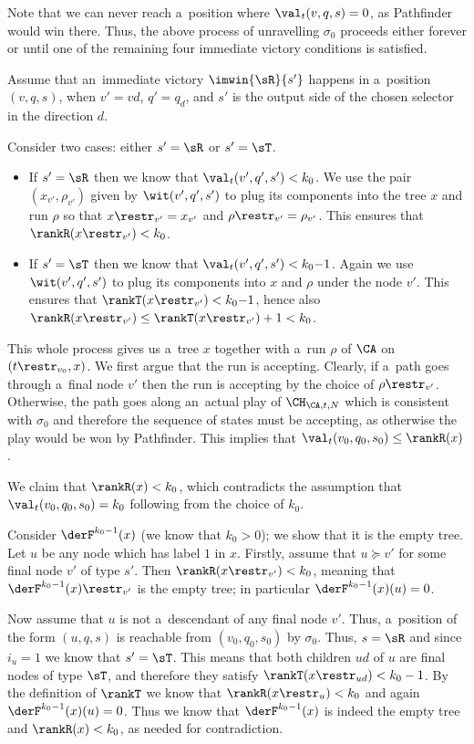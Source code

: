 \documentclass{lmcs}
\numberwithin{equation}{section}
\numberwithin{figure}{section}
\begin{document}
Note that we can never reach a~position where $\val_t(v,q,s)=0$, as Pathfinder would win there.
Thus, the above process of unravelling $\sigma_0$ proceeds either forever or until one of the remaining four immediate victory conditions is satisfied.

Assume that an~immediate victory $\imwin{\sR}{s'}$ happens in a~position $(v,q,s)$, when $v'=vd$, $q'=q_d$, and $s'$ is the output side of the chosen selector in the direction $d$.

Consider two cases: either $s'=\sR$ or $s'=\sT$.
\begin{itemize}
\item	If $s'=\sR$ then we know that $\val_t(v',q',s')<k_0$. We use the pair $(x_{v'},\rho_{v'})$ given by $\wit(v',q',s')$ to plug its components into the tree $x$ and run $\rho$
	so that $x\restr_{v'}=x_{v'}$ and $\rho\restr_{v'}=\rho_{v'}$.
	This ensures that $\rankR(x\restr_{v'})<k_0$.
\item	If $s'=\sT$ then we know that $\val_t(v',q',s')<k_0{-}1$.
	Again we use $\wit(v',q',s')$ to plug its components into $x$ and $\rho$ under the node $v'$.
	This ensures that $\rankT(x\restr_{v'})<k_0{-}1$, hence also $\rankR(x\restr_{v'})\leq\rankT(x\restr_{v'})+1<k_0$.
\end{itemize}
\noindent %
This whole process gives us a~tree $x$ together with a~run $\rho$ of $\CA$ on $(t\restr_{v_0},x)$.
We first argue that the run is accepting.
Clearly, if a~path goes through a~final node $v'$ then the run is accepting by the choice of $\rho\restr_{v'}$.
Otherwise, the path goes along an~actual play of $\CH_{\CA,t,N}$ which is consistent with $\sigma_0$ and therefore the sequence of states must be accepting,
as otherwise the play would be won by Pathfinder.
This implies that $\val_t(v_0,q_0,s_0)\leq\rankR(x)$.

We claim that $\rankR(x)< k_0$, which contradicts the assumption that $\val_t(v_0,q_0,s_0)= k_0$ following from the choice of $k_0$.

Consider $\derF^{k_0-1}(x)$ (we know that $k_0>0$); we show that it is the empty tree.
Let $u$ be any node which has label $1$ in $x$.
Firstly, assume that $u\succeq v'$ for some final node $v'$ of type $s'$.
Then $\rankR(x\restr_{v'})<k_0$, meaning that $\derF^{k_0-1}(x)\restr_{v'}$ is the empty tree; in particular $\derF^{k_0-1}(x)(u)=0$.

Now assume that $u$ is not a~descendant of any final node $v'$.
Thus, a~position of the form $(u,q,s)$ is reachable from $(v_0,q_0,s_0)$ by $\sigma_0$.
Thus, $s=\sR$ and since $i_u=1$ we know that $s'=\sT$.
This means that both children $ud$ of $u$ are final nodes of type $\sT$, and therefore they satisfy $\rankT(x\restr_{ud})< k_0-1$.
By the definition of $\rankT$ we know that $\rankR(x\restr_u)< k_0$ and again $\derF^{k_0-1}(x)(u)=0$.
Thus we know that $\derF^{k_0-1}(x)$ is indeed the empty tree and $\rankR(x)< k_0$, as needed for contradiction.
\end{document}
